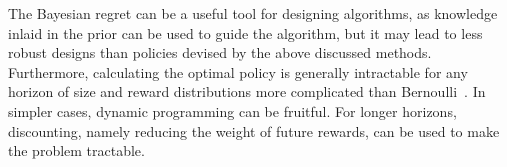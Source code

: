 The Bayesian regret can be a useful tool for designing algorithms, as knowledge inlaid in the prior can be used to guide the algorithm, but it may lead to less robust designs than policies devised by the above discussed methods.
Furthermore, calculating the optimal policy is generally intractable for any horizon of size and reward distributions more complicated than Bernoulli~\autocite{lattimore2020}.
In simpler cases, dynamic programming can be fruitful.
For longer horizons, discounting, namely reducing the weight of future rewards, can be used to make the problem tractable.